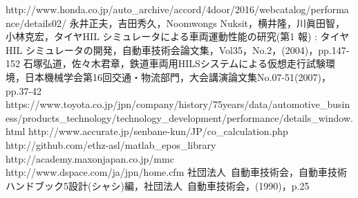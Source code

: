 \documentclass[a4paper,12pt]{article_vdlab_sotsuron}
\begin{document}
\newpage
\begin{thebibliography}{99}
  http://www.honda.co.jp/auto\_archive/accord/4door/2016/webcatalog/performance/details02/
  永井正夫，吉田秀久，Noomwongs Nuksit，横井隆，川眞田智，小林克宏，タイヤHIL シミュレータによる車両運動性能の研究(第1 報) : タイヤHIL シミュレータの開発，自動車技術会論文集，Vol35，No.2，(2004)，pp.147-152
  石塚弘道，佐々木君章，鉄道車両用HILSシステムによる仮想走行試験環境，日本機械学会第16回交通・物流部門，大会講演論文集No.07-51(2007)，pp.37-42
  https://www.toyota.co.jp/jpn/company/history/75years/data/automotive\_business/products\_technology/technology\_development/performance/details\_window.html
  http://www.accurate.jp/senbane-kun/JP/co\_calculation.php
  http://github.com/ethz-asl/matlab\_epos\_library
  http://academy.maxonjapan.co.jp/mmc
  http://www.dspace.com/ja/jpn/home.cfm
  社団法人\ 自動車技術会，自動車技術ハンドブック5設計(シャシ)編，社団法人\ 自動車技術会，(1990)，p.25
\end{thebibliography}

\newpage
\end{document}
